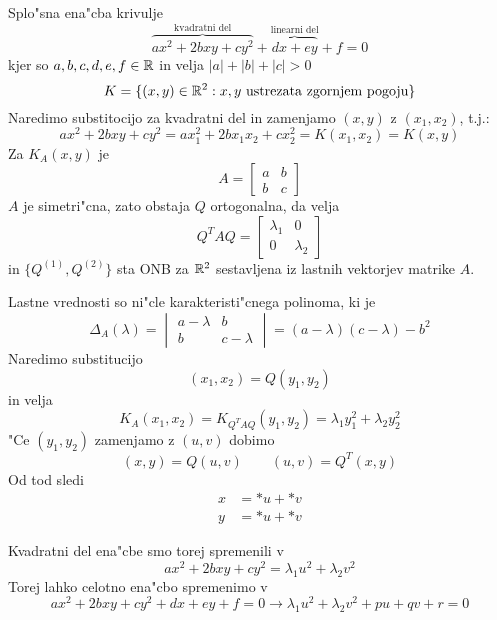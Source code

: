 Splo"sna ena"cba krivulje
\begin{equation*}
\overbrace{ax^2 + 2bxy + cy^2}^\text{kvadratni del} + \overbrace{dx + ey}^\text{linearni del} + f = 0
\end{equation*}
kjer so $a, b, c, d, e, f \in \mathbb{R}$ in velja $|a| + |b| + |c| > 0$
\begin{equation*}
K = \{ (x, y) \in \mathbb{R}^2: \text{$x, y$ ustrezata zgornjem pogoju} \}
\end{equation*}
Naredimo substitocijo za kvadratni del in zamenjamo $(x, y)$ z $(x_1, x_2)$, t.j.:
\begin{equation*}
ax^2 + 2bxy + cy^2 = ax_1^2 + 2bx_1x_2 + cx_2^2 = K(x_1, x_2) = K(x, y)
\end{equation*}
Za $K_A(x, y)$ je
\begin{equation*}
A = \begin{bmatrix}
a & b \\
b & c
\end{bmatrix}
\end{equation*}
$A$ je simetri"cna, zato obstaja $Q$ ortogonalna, da velja
\begin{equation*}
Q^T AQ = \begin{bmatrix}
\lambda_1 & 0 \\
0 & \lambda_2
\end{bmatrix}
\end{equation*}
in $\{Q^{(1)}, Q^{(2)} \}$ sta ONB za $\mathbb{R}^2$ sestavljena iz lastnih vektorjev matrike $A$.

Lastne vrednosti so ni"cle karakteristi"cnega polinoma, ki je
\begin{equation*}
\Delta_A(\lambda) = \begin{vmatrix}
a - \lambda & b \\
b & c - \lambda
\end{vmatrix} = (a-\lambda)(c-\lambda) - b^2
\end{equation*}
Naredimo substitucijo
\begin{equation*}
(x_1, x_2) = Q(y_1, y_2)
\end{equation*}
in velja
\begin{equation*}
K_A(x_1, x_2) = K_{Q^TAQ}(y_1, y_2) = \lambda_1 y_1^2 + \lambda_2 y_2^2
\end{equation*}
"Ce $(y_1, y_2)$ zamenjamo z $(u, v)$ dobimo
\begin{equation*}
(x, y) = Q(u, v) \qquad (u, v) = Q^T (x, y)
\end{equation*}
Od tod sledi
\begin{align*}
x &= *u + *v \\
y &= *u + *v
\end{align*}

Kvadratni del ena"cbe smo torej spremenili v
\begin{equation*}
ax^2 + 2bxy + cy^2 = \lambda_1 u^2 + \lambda_2 v^2
\end{equation*}
Torej lahko celotno ena"cbo spremenimo v
\begin{equation*}
ax^2 + 2bxy + cy^2 + dx + ey + f = 0 \to \lambda_1 u^2 + \lambda_2 v^2 + pu + qv + r = 0
\end{equation*}

